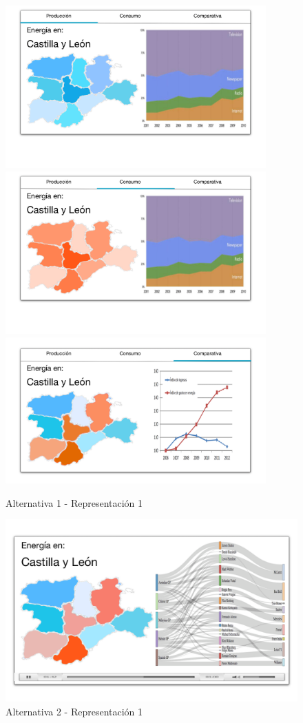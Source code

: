 \documentclass{article}
\begin{document}
			\begin{figure}[H]
				\centering
				\includegraphics[width=100mm]{../res/design2-1.png}
				\includegraphics[width=100mm]{../res/design2-2.png}
				\includegraphics[width=100mm]{../res/design2-3.png}
				\caption{Alternativa 1 - Representación 1 \label{sketch1}}
			\end{figure}
		
			\begin{figure}[H]
				\centering
				\includegraphics[width=130mm]{../res/design3.png}
				\caption{Alternativa 2 - Representación 1 \label{sketch21}}
			\end{figure}
		
\end{document}
